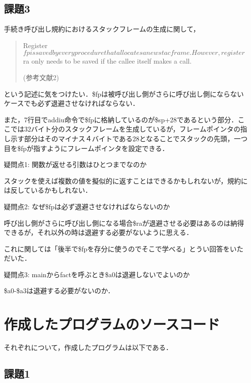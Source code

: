 \documentclass[a4j]{jarticle}
\begin{document}
\subsection{課題3}

手続き呼び出し規約におけるスタックフレームの生成に関して，

\begin{quote}
Register $fp is saved by every procedure that allocates a new stac frame. However, register $ra only needs to be saved if the callee itself makes a call.

(参考文献2)
\end{quote}

という記述に気をつけたい．\$fpは被呼び出し側がさらに呼び出し側にならないケースでも必ず退避させなければならない．

また，7行目でaddiu命令で\$fpに格納しているのが\$sp+28であるという部分．ここでは32バイト分のスタックフレームを生成しているが，フレームポインタの指し示す部分はそのマイナス４バイトである28となることでスタックの先頭，一つ目を\$fpが指すようにフレームポインタを設定できる．  


疑問点1: 関数が返せる引数はひとつまでなのか

スタックを使えば複数の値を擬似的に返すことはできるかもしれないが，規約には反しているかもしれない．

疑問点2:  なぜ\$fpは必ず退避させなければならないのか

呼び出し側がさらに呼び出し側になる場合\$raが退避させる必要はあるのは納得できるが，それ以外の時は退避する必要がないように思える．

これに関しては「後半で\$fpを存分に使うのでそこで学べる」とうい回答をいただいた．

疑問点3: mainからfactを呼ぶとき\$a0は退避しないでよいのか

\$a0-\$a3は退避する必要がないのか．


\newpage

%
%

\section{作成したプログラムのソースコード}

それぞれについて，作成したプログラムは以下である．

\subsection{課題1}


\end{document}
